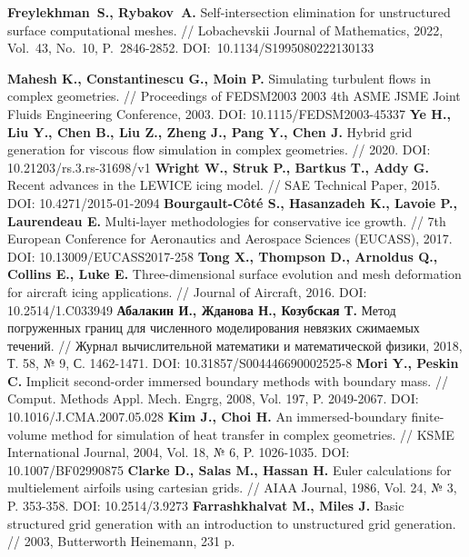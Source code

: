\begin{thebibliography}{99}
%
\textbf{Freylekhman~S., Rybakov~A.} Self-intersection elimination for unstructured surface computational meshes. // Lobachevskii Journal of Mathematics, 2022, Vol.~43, No.~10, P.~2846-2852. DOI:~10.1134/S1995080222130133
%



%
\textbf{Mahesh K., Constantinescu G., Moin P.} Simulating turbulent flows in complex geometries. // Proceedings of FEDSM2003 2003 4th ASME JSME Joint Fluids Engineering Conference, 2003. DOI: 10.1115/FEDSM2003-45337
%
\textbf{Ye H., Liu Y., Chen B., Liu Z., Zheng J., Pang Y., Chen J.} Hybrid grid generation for viscous flow simulation in complex geometries. // 2020. DOI: 10.21203/rs.3.rs-31698/v1
%
\textbf{Wright W., Struk P., Bartkus T., Addy G.} Recent advances in the LEWICE icing model. // SAE Technical Paper, 2015. DOI: 10.4271/2015-01-2094
%
\textbf{Bourgault-Côté S., Hasanzadeh K., Lavoie P., Laurendeau E.} Multi-layer methodologies for conservative ice growth. // 7th European Conference for Aeronautics and Aerospace Sciences (EUCASS), 2017. DOI: 10.13009/EUCASS2017-258
%
\textbf{Tong X., Thompson D., Arnoldus Q., Collins E., Luke E.} Three-dimensional surface evolution and mesh deformation for aircraft icing applications. // Journal of Aircraft, 2016. DOI: 10.2514/1.C033949
%
\textbf{Абалакин И., Жданова Н., Козубская Т.} Метод погруженных границ для численного моделирования невязких сжимаемых течений. // Журнал вычислительной математики и математической физики, 2018, Т. 58, № 9, С. 1462-1471. DOI: 10.31857/S004446690002525-8
%
\textbf{Mori Y., Peskin C.} Implicit second-order immersed boundary methods with boundary mass. // Comput. Methods Appl. Mech. Engrg, 2008, Vol. 197, P. 2049-2067. DOI: 10.1016/J.CMA.2007.05.028
%
\textbf{Kim J., Choi H.} An immersed-boundary finite-volume method for simulation of heat transfer in complex geometries. // KSME International Journal, 2004, Vol. 18, № 6, P. 1026-1035. DOI: 10.1007/BF02990875
%
\textbf{Clarke D., Salas M., Hassan H.} Euler calculations for multielement airfoils using cartesian grids. // AIAA Journal, 1986, Vol. 24, № 3, P. 353-358. DOI: 10.2514/3.9273
%
\textbf{Farrashkhalvat M., Miles J.} Basic structured grid generation with an introduction to unstructured grid generation. // 2003, Butterworth Heinemann, 231 p.

\end{thebibliography}
